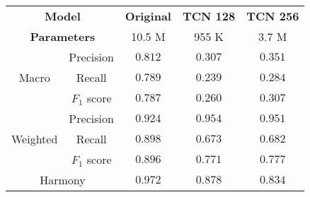 \begin{tabular}{cc|ccc}
    \multicolumn{2}{c|}{\textbf{Model}} & \textbf{Original} & \textbf{TCN 128} & \textbf{TCN 256} \\
    \multicolumn{2}{c|}{\textbf{Parameters}} & 10.5 M & 955 K & 3.7 M \\\hline
    \multirow{3}{*}{Macro}    & Precision   & $\mathbf{0.812}$ & $0.307$          & $0.351$ \\
    & Recall      & $\mathbf{0.789}$ & $0.239$          & $0.284$ \\
    & $F_1$ score & $\mathbf{0.787}$ & $0.260$          & $0.307$ \\\hline
    \multirow{3}{*}{Weighted} & Precision   & $0.924$          & $\mathbf{0.954}$ & $0.951$ \\
    & Recall      & $\mathbf{0.898}$ & $0.673$          & $0.682$ \\
    & $F_1$ score & $\mathbf{0.896}$ & $0.771$          & $0.777$ \\\hline
    \multicolumn{2}{c|}{Harmony} & $\mathbf{0.972}$ & $0.878$ & $0.834$ \\
\end{tabular}
